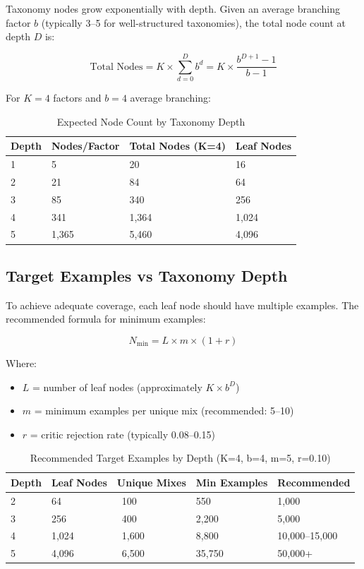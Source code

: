 Taxonomy nodes grow exponentially with depth. Given an average branching factor $b$
(typically 3--5 for well-structured taxonomies), the total node count at depth $D$ is:

\[
\text{Total Nodes} = K \times \sum_{d=0}^{D} b^d = K \times \frac{b^{D+1} - 1}{b - 1}
\]

\noindent
For $K=4$ factors and $b=4$ average branching:

\begin{table}[H]
\centering
\caption{Expected Node Count by Taxonomy Depth}
\label{tab:depth-nodes}
\begin{tabular}{llll}
\toprule
\textbf{Depth} & \textbf{Nodes/Factor} & \textbf{Total Nodes (K=4)} & \textbf{Leaf Nodes} \\
\midrule
1 & 5 & 20 & 16 \\
2 & 21 & 84 & 64 \\
3 & 85 & 340 & 256 \\
4 & 341 & 1,364 & 1,024 \\
5 & 1,365 & 5,460 & 4,096 \\
\bottomrule
\end{tabular}
\end{table}

\subsection{Target Examples vs Taxonomy Depth}

To achieve adequate coverage, each leaf node should have multiple examples. The
recommended formula for minimum examples:

\[
N_{\min} = L \times m \times (1 + r)
\]

\noindent
Where:
\begin{itemize}
  \item $L$ = number of leaf nodes (approximately $K \times b^D$)
  \item $m$ = minimum examples per unique mix (recommended: 5--10)
  \item $r$ = critic rejection rate (typically 0.08--0.15)
\end{itemize}

\begin{table}[H]
\centering
\caption{Recommended Target Examples by Depth (K=4, b=4, m=5, r=0.10)}
\label{tab:target-by-depth}
\begin{tabular}{lllll}
\toprule
\textbf{Depth} & \textbf{Leaf Nodes} & \textbf{Unique Mixes} & \textbf{Min Examples} & \textbf{Recommended} \\
\midrule
2 & 64 & ~100 & 550 & 1,000 \\
3 & 256 & ~400 & 2,200 & 5,000 \\
4 & 1,024 & ~1,600 & 8,800 & 10,000--15,000 \\
5 & 4,096 & ~6,500 & 35,750 & 50,000+ \\
\bottomrule
\end{tabular}
\end{table}

